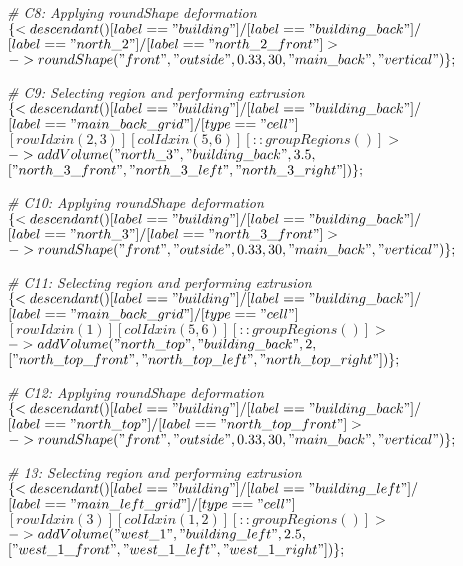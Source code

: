 \noindent \textit{\# C8: Applying roundShape deformation}\\
$\{< descendant() [label=="building"] / [label=="building\_back"] / $\\
$[label=="north\_2"] / [label=="north\_2\_front"] > $\\
$-> roundShape("front", "outside", 0.33, 30, "main\_back", "vertical")\};$

\noindent \textit{\# C9: Selecting region and performing extrusion}\\
$\{< descendant() [label=="building"] / [label=="building\_back"] / $\\
$[label=="main\_back\_grid"] / [type=="cell"] $\\
$[rowIdx in (2, 3)] [colIdx in (5, 6)] [::groupRegions()] > $\\
$-> addVolume("north\_3", "building\_back", 3.5, $\\
$["north\_3\_front", "north\_3\_left", "north\_3\_right"])\};$

\noindent \textit{\# C10: Applying roundShape deformation}\\
$\{< descendant() [label=="building"] / [label=="building\_back"] / $\\
$[label=="north\_3"] / [label=="north\_3\_front"] > $\\
$-> roundShape("front", "outside", 0.33, 30, "main\_back", "vertical")\};$

\noindent \textit{\# C11: Selecting region and performing extrusion}\\
$\{< descendant() [label=="building"] / [label=="building\_back"] / $\\
$[label=="main\_back\_grid"] / [type=="cell"] $\\
$[rowIdx in (1)] [colIdx in (5, 6)] [::groupRegions()] > $\\
$-> addVolume("north\_top", "building\_back", 2, $\\
$["north\_top\_front", "north\_top\_left", "north\_top\_right"])\};$

\noindent \textit{\# C12: Applying roundShape deformation}\\
$\{< descendant() [label=="building"] / [label=="building\_back"] / $\\
$[label=="north\_top"] / [label=="north\_top\_front"] > $\\
$-> roundShape("front", "outside", 0.33, 30, "main\_back", "vertical")\};$

\noindent \textit{\# 13: Selecting region and performing extrusion}\\
$\{< descendant() [label=="building"] / [label=="building\_left"] / $\\
$[label=="main\_left\_grid"] / [type=="cell"] $\\
$[rowIdx in (3)] [colIdx in (1, 2)] [::groupRegions()] > $\\
$-> addVolume("west\_1", "building\_left", 2.5, $\\
$["west\_1\_front", "west\_1\_left", "west\_1\_right"])\};$

